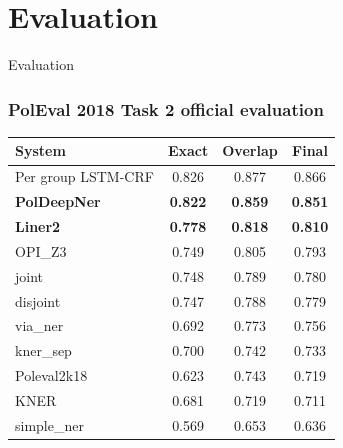 \documentclass[Warsaw]{beamer}
\begin{document}
\section{Evaluation}

\begin{frame}
    \begin{center}
        \Huge
        Evaluation
    \end{center}
\end{frame}

\begin{frame}
    \frametitle{PolEval 2018 Task 2 official evaluation}
  \begin{table}[ht]
      \scriptsize
      \centering
      \begin{tabular}{l|c|c|c}
	  \textbf{System}	
	  & \hspace{0.2em} \textbf{Exact} \hspace{0.2em} 
	  & \hspace{0.2em} \textbf{Overlap} \hspace{0.2em} 
	  & \hspace{0.2em} \textbf{Final} \hspace{0.2em}\\
	  \hline
	  \hline
	  Per group LSTM-CRF 	& 0.826	 & 0.877 & 0.866 \\
	  \textbf{PolDeepNer}	& \textbf{0.822} & \textbf{0.859} &	\textbf{0.851} \\
	  \textbf{Liner2}	        & \textbf{0.778} & \textbf{0.818} & \textbf{0.810} \\
	  OPI\_Z3                 & 0.749 & 0.805 & 0.793 \\
	  joint	                & 0.748	& 0.789	& 0.780 \\
	  disjoint	        & 0.747	& 0.788	& 0.779 \\
	  via\_ner	        & 0.692	& 0.773	& 0.756 \\
	  kner\_sep	        & 0.700	& 0.742	& 0.733 \\
	  Poleval2k18	        & 0.623	& 0.743	& 0.719 \\
	  KNER	 	        & 0.681	& 0.719	& 0.711 \\
	  simple\_ner	        & 0.569	& 0.653	& 0.636 \\
      \end{tabular}
      \label{tab:poleval-task2-results}
  \end{table}    
\end{frame}
\end{document}
